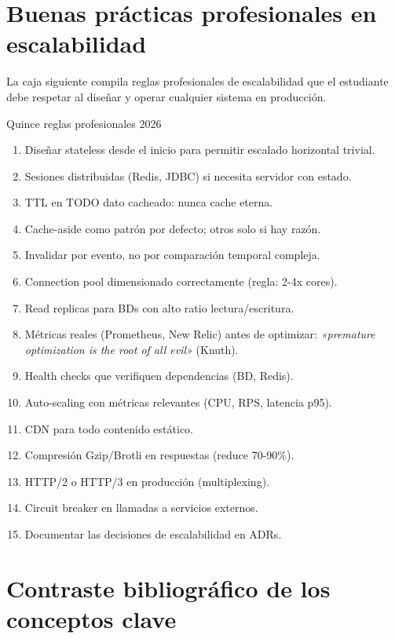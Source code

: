 \section{Buenas prácticas profesionales en escalabilidad}

La caja siguiente compila reglas profesionales de
escalabilidad que el estudiante debe respetar al diseñar y operar
cualquier sistema en producción.


\begin{cajabuenas}{Quince reglas profesionales 2026}
\begin{enumerate}
\item Diseñar stateless desde el inicio para permitir escalado
horizontal trivial.
\item Sesiones distribuidas (Redis, JDBC) si necesita servidor con
estado.
\item TTL en TODO dato cacheado: nunca cache eterna.
\item Cache-aside como patrón por defecto; otros solo si hay razón.
\item Invalidar por evento, no por comparación temporal compleja.
\item Connection pool dimensionado correctamente (regla: 2-4x cores).
\item Read replicas para BDs con alto ratio lectura/escritura.
\item Métricas reales (Prometheus, New Relic) antes de optimizar:
\emph{«premature optimization is the root of all evil»} (Knuth).
\item Health checks que verifiquen dependencias (BD, Redis).
\item Auto-scaling con métricas relevantes (CPU, RPS, latencia p95).
\item CDN para todo contenido estático.
\item Compresión Gzip/Brotli en respuestas (reduce 70-90\%).
\item HTTP/2 o HTTP/3 en producción (multiplexing).
\item Circuit breaker en llamadas a servicios externos.
\item Documentar las decisiones de escalabilidad en ADRs.
\end{enumerate}
\end{cajabuenas}

\section{Contraste bibliográfico de los conceptos clave}

